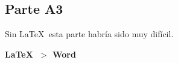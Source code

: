 \subsection{Parte A3}%
\label{sub:conclu_parte_a3}

Sin \LaTeX\ esta parte habría sido muy difícil.
\begin{center}
	\textbf{\huge{\LaTeX\ $>$ Word}}
\end{center}
